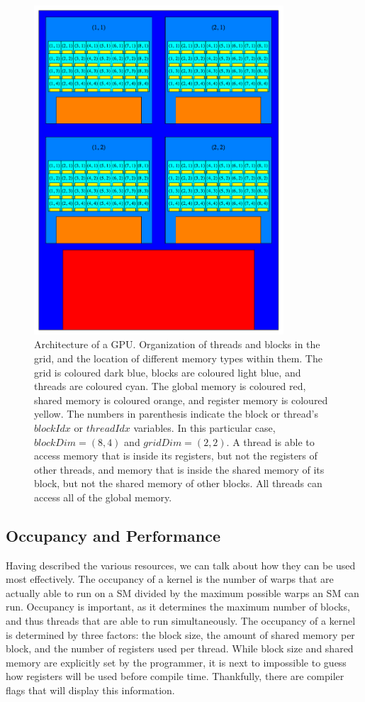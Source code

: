\begin{figure}
\center
\includegraphics[width=0.83\textwidth]{Figures/gpu_arc.png}
\caption[Architecture of a GPU]
{Architecture of a GPU. Organization of threads and blocks in the grid, and the location of different memory types within them. The grid is coloured dark blue, blocks are coloured light blue, and threads are coloured cyan. The global memory is coloured red, shared memory is coloured orange, and register memory is coloured yellow. The numbers in parenthesis indicate the block or thread's $blockIdx$ or $threadIdx$ variables. In this particular case, $blockDim=(8,4)$ and $gridDim=(2,2)$. A thread is able to access memory that is inside its registers, but not the registers of other threads, and memory that is inside the shared memory of its block, but not the shared memory of other blocks. All threads can access all of the global memory.}
\label{fig:gpuarc}
\end{figure}

\subsection{Occupancy and Performance}
\label{sec:gpuocc}
Having described the various resources, we can talk about how they can be used most effectively. The occupancy of a kernel is the number of warps that are actually able to run on a SM divided by the maximum possible warps an SM can run. Occupancy is important, as it determines the maximum number of blocks, and thus threads that are able to run simultaneously. The occupancy of a kernel is determined by three factors: the block size, the amount of shared memory per block, and the number of registers used per thread. While block size and shared memory are explicitly set by the programmer, it is next to impossible to guess how registers will be used before compile time. Thankfully, there are compiler flags that will display this information.

